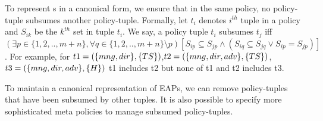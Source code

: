 




To represent \EAP{}s in a canonical form, we ensure that in the same policy, no policy-tuple subsumes another policy-tuple. Formally, let $t_i$ denotes $i^{th}$ tuple in a policy and $S_{ik}$  be the $k^{th}$ set in tuple $t_i$. We say, a policy tuple $t_i$ subsumes $t_j$ iff  $(\exists p \in \{1,2,..,m+n\}, \forall q \in \{1,2,..,m+n\} \setminus {p})[S_{ip} \subseteq S_{jp} \land (S_{iq} \subseteq S_{jq} \lor S_{ip} = S_{jp}) ]$. For example, for $t1=(\{mng,dir\}, \{TS\})$,$t2=(\{mng, dir, adv\}, \{TS\})$, $t3=(\{mng,dir, adv\}, \{H\})$ t1 includes t2 but none of t1 and t2 includes t3. 



To maintain a canonical representation of EAPs, we can remove policy-tuples that have been subsumed by other tuples. It is also possible to specify more sophisticated meta policies to manage subsumed policy-tuples.  



